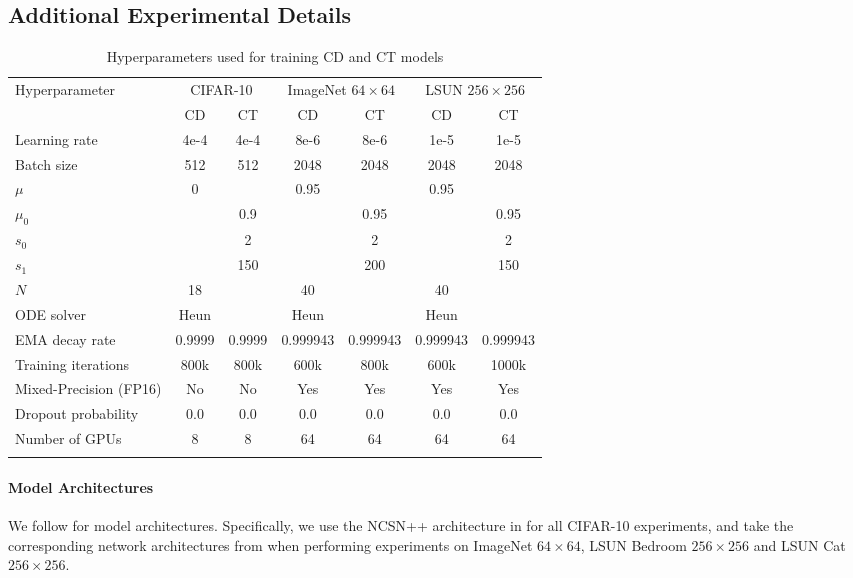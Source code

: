 \begin{appendices}
\section{Additional Experimental Details}\label{app:exp}
\begin{table}
    \setlength{\tabcolsep}{15pt}
    \caption{Hyperparameters used for training CD and CT models}\label{tab:hyperparameters}
    \centering
    \begin{adjustbox}{max width=\linewidth}
        \begin{tabular}{l|cc|cc|cc}
            \Xhline{3\arrayrulewidth}
            Hyperparameter & \multicolumn{2}{c|}{CIFAR-10} & \multicolumn{2}{c|}{ImageNet $64\times 64$} & \multicolumn{2}{c}{LSUN $256\times 256$} \\
            & CD & CT & CD & CT & CD & CT\\
            \hline
            Learning rate & 4e-4 & 4e-4 & 8e-6 & 8e-6 & 1e-5 & 1e-5\\
            Batch size & 512 & 512 & 2048 & 2048 & 2048 & 2048\\
            $\mu$ & 0 &  & 0.95 & & 0.95 & \\
            $\mu_0$ & & 0.9 & & 0.95 & & 0.95\\
            $s_0$ & & 2 & & 2 & & 2 \\
            $s_1$ & & 150 & & 200 & & 150 \\
            $N$ & 18 & & 40 & & 40 & \\
            ODE solver & Heun & & Heun & & Heun & \\
            EMA decay rate & 0.9999 & 0.9999 & 0.999943 & 0.999943 & 0.999943 & 0.999943\\
            Training iterations & 800k & 800k & 600k & 800k & 600k & 1000k\\
            Mixed-Precision (FP16) & No & No & Yes & Yes & Yes & Yes\\
            Dropout probability & 0.0 & 0.0 & 0.0 & 0.0 & 0.0 & 0.0\\
            Number of GPUs & 8 & 8 & 64 & 64 & 64 & 64\\
            \Xhline{3\arrayrulewidth}
        \end{tabular}
    \end{adjustbox}
\end{table}

\paragraph{Model Architectures} We follow \citet{song2021scorebased,dhariwal2021diffusion} for model architectures. Specifically, we use the NCSN++ architecture in \citet{song2021scorebased} for all CIFAR-10 experiments, and take the corresponding network architectures from \citet{dhariwal2021diffusion} when performing experiments on ImageNet $64\times 64$, LSUN Bedroom $256\times 256$ and LSUN Cat $256\times 256$.


\end{appendices}
